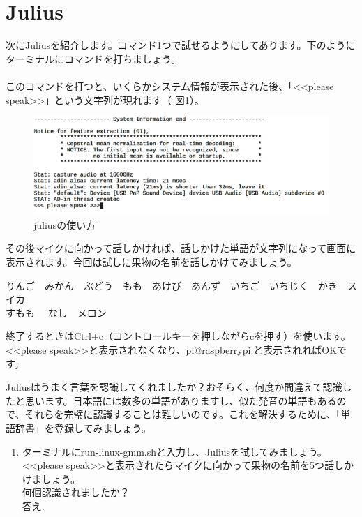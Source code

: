 \section{Julius}\label{Julius}
次にJuliusを紹介します。コマンド1つで試せるようにしてあります。下のようにターミナルにコマンドを打ちましょう。\\
\\
このコマンドを打つと、いくらかシステム情報が表示された後、「<<please speak>>」という文字列が現れます（ 図\ref{juliusの使い方}）。

\begin{figure}[H]
\begin{center}
    \includegraphics[width=\linewidth]{images/chap06/text06-img009.png}
    \caption{juliusの使い方}
    \label{juliusの使い方}
\end{center}
\end{figure}

その後マイクに向かって話しかければ、話しかけた単語が文字列になって画面に表示されます。今回は試しに果物の名前を話しかけてみましょう。
\begin{center}
	りんご　みかん　ぶどう　もも　あけび　あんず　いちご　いちじく　かき　スイカ\\すもも　	なし　メロン
\end{center}
	
終了するときはCtrl+c（コントロールキーを押しながらcを押す）を使います。<<please speak>>と表示されなくなり、pi@raspberrypi:と表示されればOKです。

Juliusはうまく言葉を認識してくれましたか？おそらく、何度か間違えて認識したと思います。日本語には数多の単語がありますし、似た発音の単語もあるので、それらを完璧に認識することは難しいのです。これを解決するために、「単語辞書」を登録してみましょう。\\

\begin{tcolorbox}[title=\useOmetoi]
\begin{enumerate}
\item ターミナルにrun-linux-gmm.shと入力し、Juliusを試してみましょう。\\<<please speak>>と表示されたらマイクに向かって果物の名前を5つ話しかけましょう。\\何個認識されましたか？\\ \underline{答え.\hspace{0.8\linewidth}}
\end{enumerate}
\end{tcolorbox}